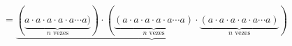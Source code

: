 \documentclass[preview]{standalone}
\begin{document}
\begin{align*}
=\underbrace{(\underbrace{a \cdot a \cdot a \cdot a \cdot a \cdots a)}_{n \text{ vezes}})\cdot(\underbrace{(a \cdot a \cdot a \cdot a \cdot a \cdots a)}_{n \text{ vezes}}\cdot\underbrace{(a \cdot a \cdot a \cdot a \cdot a \cdots a)}_{n \text{ vezes}})}
\end{align*}
\end{document}
